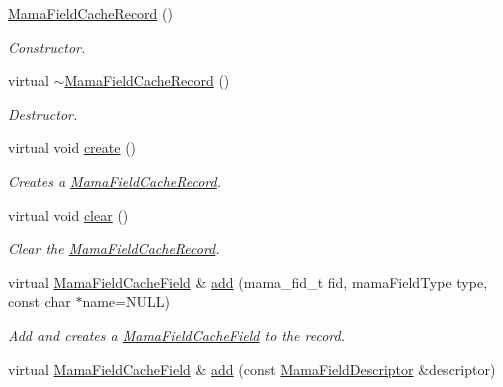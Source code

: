 \begin{DoxyCompactItemize}
\item 
\hyperlink{classWombat_1_1MamaFieldCacheRecord_a75145dcdba920aff38f3bc4b1a4fcda3}{MamaFieldCacheRecord} ()
\begin{DoxyCompactList}\small\item\em Constructor. \item\end{DoxyCompactList}\item 
virtual \hyperlink{classWombat_1_1MamaFieldCacheRecord_a967822701415a8d1652cd58a9f1fd33b}{$\sim$MamaFieldCacheRecord} ()
\begin{DoxyCompactList}\small\item\em Destructor. \item\end{DoxyCompactList}\item 
virtual void \hyperlink{classWombat_1_1MamaFieldCacheRecord_add08406b276baa59a6d9cb874601542e}{create} ()
\begin{DoxyCompactList}\small\item\em Creates a {\ttfamily \hyperlink{classWombat_1_1MamaFieldCacheRecord}{MamaFieldCacheRecord}}. \item\end{DoxyCompactList}\item 
virtual void \hyperlink{classWombat_1_1MamaFieldCacheRecord_a206453bd98fe5f534609602f21041f0e}{clear} ()
\begin{DoxyCompactList}\small\item\em Clear the {\ttfamily \hyperlink{classWombat_1_1MamaFieldCacheRecord}{MamaFieldCacheRecord}}. \item\end{DoxyCompactList}\item 
virtual \hyperlink{classWombat_1_1MamaFieldCacheField}{MamaFieldCacheField} \& \hyperlink{classWombat_1_1MamaFieldCacheRecord_a0f473ab50b75ac75bbdeeb3bbf0ada23}{add} (mama\_\-fid\_\-t fid, mamaFieldType type, const char $\ast$name=NULL)
\begin{DoxyCompactList}\small\item\em Add and creates a {\ttfamily \hyperlink{classWombat_1_1MamaFieldCacheField}{MamaFieldCacheField}} to the record. \item\end{DoxyCompactList}\item 
virtual \hyperlink{classWombat_1_1MamaFieldCacheField}{MamaFieldCacheField} \& \hyperlink{classWombat_1_1MamaFieldCacheRecord_a554576f226821f33a6c8ec3e1421d71b}{add} (const \hyperlink{classWombat_1_1MamaFieldDescriptor}{MamaFieldDescriptor} \&descriptor)

\end{DoxyCompactItemize}
